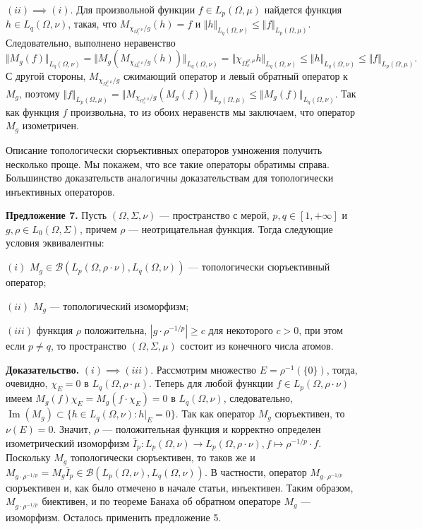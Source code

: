 \documentclass[11pt,twoside]{article}
\begin{document}
$(ii)$$\implies$$ (i)$. Для произвольной функции $f\in L_p(\Omega,\mu)$ найдется функция  $h\in L_q(\Omega,\nu)$, такая, что $M_{\chi_{\Omega_c^{\nu,\mu}}/g}(h)=f$ и $\Vert h\Vert_{L_q(\Omega,\nu)}\leq \Vert f\Vert_{L_p(\Omega,\mu)}$. Следовательно, выполнено неравенство 
$$
\Vert M_g(f)\Vert_{L_q(\Omega,\nu)}
=\Vert M_g(M_{\chi_{\Omega_c^{\nu,\mu}}/g}(h))\Vert_{L_q(\Omega,\nu)}
=\Vert \chi_{\Omega_c^{\nu,\mu}}h\Vert_{L_q(\Omega,\nu)}
\leq\Vert h\Vert_{L_q(\Omega,\nu)}
\leq\Vert f\Vert_{L_p(\Omega,\mu)}.
$$
С другой стороны, $M_{\chi_{\Omega_c^{\nu,\mu}}/g}$ сжимающий оператор и левый обратный оператор к  $M_g$, поэтому $\Vert f\Vert_{L_p(\Omega,\mu)}
=\Vert M_{\chi_{\Omega_c^{\nu,\mu}}/g}(M_g(f))\Vert_{L_p(\Omega,\mu)}
\leq\Vert M_g(f)\Vert_{L_q(\Omega,\nu)}$. Так как функция $f$ произвольна, то из обоих неравенств мы заключаем, что оператор $M_g$ изометричен.















Описание топологически сюръективных операторов умножения получить несколько проще. Мы покажем, что все такие операторы обратимы справа. Большинство доказательств аналогичны доказательствам для топологически инъективных операторов.

\textbf{Предложение 7.} Пусть $(\Omega,\Sigma,\nu)$ --- пространство с мерой, $p,q\in[1,+\infty]$ и $g,\rho\in L_0(\Omega,\Sigma)$, причем $\rho$ --- неотрицательная функция. Тогда следующие условия эквивалентны:

$(i)$ $M_g\in\mathcal{B}(L_p(\Omega,\rho\cdot\nu),L_q(\Omega,\nu))$ --- топологически сюръективный оператор;

$(ii)$ $M_g$ --- топологический изоморфизм;

$(iii)$ функция $\rho$ положительна, $|g\cdot \rho^{-1/p}|\geq c$ для некоторого $c>0$, при этом если $p\neq q$, то пространство $(\Omega,\Sigma,\mu)$ состоит из конечного числа атомов.


\textbf{Доказательство.} $(i)$$\implies$$(iii)$. Рассмотрим множество $E=\rho^{-1}(\{0\})$, тогда, очевидно, $\chi_E=0$ в $L_q(\Omega,\rho\cdot\mu)$. Теперь для любой функции $f\in L_p(\Omega,\rho\cdot\nu)$ имеем $M_g(f)\chi_E=M_g(f\cdot\chi_E)=0$ в $L_q(\Omega,\nu)$, следовательно, $\operatorname{Im}(M_g)\subset\{h\in L_q(\Omega,\nu): h|_E=0\}$. Так как оператор $M_g$ сюръективен, то $\nu(E)=0$. Значит, $\rho$ --- положительная функция и корректно определен изометрический изоморфизм $\bar{I}_p:L_p(\Omega,\nu)\to L_p(\Omega,\rho\cdot\nu),f\mapsto \rho^{-1/p}\cdot f$. Поскольку $M_g$ топологически сюръективен, то таков же и $M_{g\cdot\rho^{-1/p}}=M_g \bar{I}_p\in\mathcal{B}(L_p(\Omega,\nu),L_q(\Omega,\nu))$. В частности, оператор $M_{g\cdot\rho^{-1/p}}$ сюръективен и, как было отмечено в начале статьи, инъективен. Таким образом, $M_{g\cdot\rho^{-1/p}}$ биективен, и по теореме Банаха об обратном операторе $M_g$ --- изоморфизм. Осталось применить предложение 5.
\end{document}
